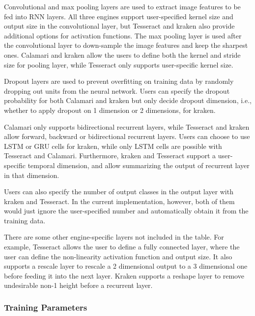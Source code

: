 \documentclass[sigconf]{acmart}
\begin{document}
Convolutional and max pooling layers are used to extract image features to be fed into RNN layers. All three engines support user-specified kernel size and output size in the convolutional layer, but Tesseract and kraken also provide additional options for activation functions. The max pooling layer is used after the convolutional layer to down-sample the image features and keep the sharpest ones. Calamari and kraken allow the users to define both the kernel and stride size for pooling layer, while Tesseract only supports user-specific kernel size.

Dropout layers are used to prevent overfitting on training data by randomly dropping out units from the neural network. Users can specify the dropout probability for both Calamari and kraken but only decide dropout dimension, i.e., whether to apply dropout on 1 dimension or 2 dimensions, for kraken. 

Calamari only supports bidirectional recurrent layers, while Tesseract and kraken allow forward, backward or bidirectional recurrent layers. Users can choose to use LSTM or GRU cells for kraken, while only LSTM cells are possible with Tesseract and Calamari. Furthermore, kraken and Tesseract support a user-specific temporal dimension, and allow summarizing the output of recurrent layer in that dimension.

Users can also specify the number of output classes in the output layer with kraken and Tesseract. In the current implementation, however, both of them would just ignore the user-specified number and automatically obtain it from the training data. 

There are some other engine-specific layers not included in the table. For example, Tesseract allows the user to define a fully connected layer, where the user can define the non-linearity activation function and output size. It also supports a rescale layer to rescale a 2 dimensional output to a 3 dimensional one before feeding it into the next layer. Kraken supports a reshape layer to remove undesirable non-1 height before a recurrent layer.

\subsubsection{Training Parameters}
\end{document}
